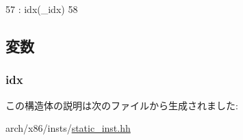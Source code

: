 \begin{DoxyCode}
57                                              : idx(_idx)
58         {}
\end{DoxyCode}


\subsection{変数}
\hypertarget{structX86ISA_1_1InstRegIndex_aaee9fd8ad7555c0960f0e79c462c00aa}{
\subsubsection[{idx}]{ {\bf idx}}}
\label{structX86ISA_1_1InstRegIndex_aaee9fd8ad7555c0960f0e79c462c00aa}


この構造体の説明は次のファイルから生成されました:\begin{DoxyCompactItemize}
\item 
arch/x86/insts/\hyperlink{arch_2x86_2insts_2static__inst_8hh}{static\_\-inst.hh}\end{DoxyCompactItemize}
